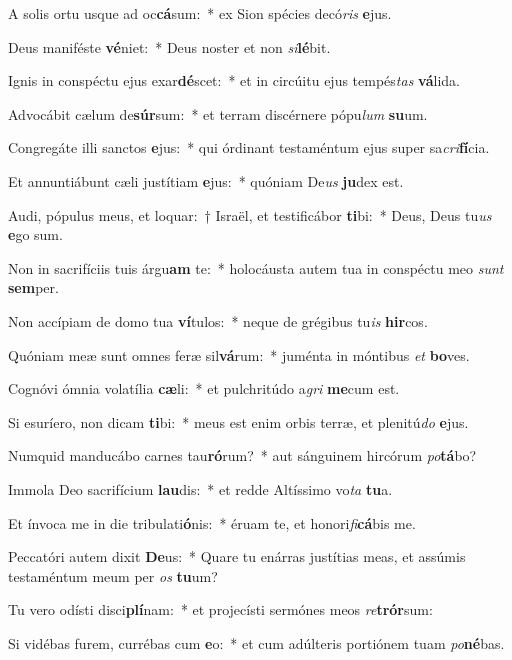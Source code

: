 \item A solis ortu usque ad oc\textbf{cá}sum:~* ex Sion spécies decó\textit{ris} \textbf{e}jus.
\item Deus maniféste \textbf{vé}niet:~* Deus noster et non \textit{si}\textbf{lé}bit.
\item Ignis in conspéctu ejus exar\textbf{dé}scet:~* et in circúitu ejus tempés\textit{tas} \textbf{vá}lida.
\item Advocábit cælum de\textbf{súr}sum:~* et terram discérnere pópu\textit{lum} \textbf{su}um.
\item Congregáte illi sanctos \textbf{e}jus:~* qui órdinant testaméntum ejus super sa\textit{cri}\textbf{fí}cia.
\item Et annuntiábunt cæli justítiam \textbf{e}jus:~* quóniam De\textit{us} \textbf{ju}dex est.
\item Audi, pópulus meus, et loquar:~† Israël, et testificábor \textbf{ti}bi:~* Deus, Deus tu\textit{us} \textbf{e}go sum.
\item Non in sacrifíciis tuis árgu\textbf{am} te:~* holocáusta autem tua in conspéctu meo \textit{sunt} \textbf{sem}per.
\item Non accípiam de domo tua \textbf{ví}tulos:~* neque de grégibus tu\textit{is} \textbf{hir}cos.
\item Quóniam meæ sunt omnes feræ sil\textbf{vá}rum:~* juménta in móntibus \textit{et} \textbf{bo}ves.
\item Cognóvi ómnia volatília \textbf{cæ}li:~* et pulchritúdo a\textit{gri} \textbf{me}cum est.
\item Si esuríero, non dicam \textbf{ti}bi:~* meus est enim orbis terræ, et plenitú\textit{do} \textbf{e}jus.
\item Numquid manducábo carnes tau\textbf{ró}rum?~* aut sánguinem hircórum \textit{po}\textbf{tá}bo?
\item Immola Deo sacrifícium \textbf{lau}dis:~* et redde Altíssimo vo\textit{ta} \textbf{tu}a.
\item Et ínvoca me in die tribulati\textbf{ó}nis:~* éruam te, et honori\textit{fi}\textbf{cá}bis me.
\item Peccatóri autem dixit \textbf{De}us:~* Quare tu enárras justítias meas, et assúmis testaméntum meum per \textit{os} \textbf{tu}um?
\item Tu vero odísti disci\textbf{plí}nam:~* et projecísti sermónes meos \textit{re}\textbf{trór}sum:
\item Si vidébas furem, currébas cum \textbf{e}o:~* et cum adúlteris portiónem tuam \textit{po}\textbf{né}bas.
